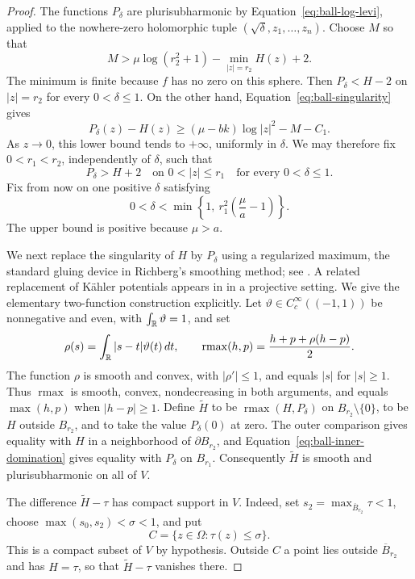 \begin{proof}
The functions $P_\delta$ are plurisubharmonic by
Equation~\eqref{eq:ball-log-levi}, applied to the nowhere-zero
holomorphic tuple $(\sqrt\delta,z_1,\ldots,z_n)$.  Choose $M$ so that
\[
 M>\mu\log(r_2^2+1)-\min_{|z|=r_2}H(z)+2.
\]
The minimum is finite because $f$ has no zero on this sphere.  Then
$P_\delta<H-2$ on $|z|=r_2$ for every $0<\delta\le1$.
On the other hand, Equation~\eqref{eq:ball-singularity} gives
\[
 P_\delta(z)-H(z)
 \ge(\mu-bk)\log|z|^2-M-C_1.
\]
As $z\to0$, this lower bound tends to $+\infty$, uniformly in $\delta$.
We may therefore fix $0<r_1<r_2$, independently of $\delta$, such that
\begin{equation}
 P_\delta>H+2\quad\text{on }0<|z|\le r_1
 \quad\text{for every }0<\delta\le1.
 \label{eq:ball-inner-domination}
\end{equation}
Fix from now on one positive $\delta$ satisfying
\begin{equation}
 0<\delta<\min\left\{1,\ r_1^2\left(\frac\mu a-1\right)\right\}.
 \label{eq:ball-delta-choice}
\end{equation}
The upper bound is positive because $\mu>a$.

We next replace the singularity of $H$ by $P_\delta$ using a
regularized maximum, the standard gluing device in Richberg's smoothing
method; see \cite[Section~2]{HarveyLawsonPlis2020}. A related replacement
of K\"ahler potentials appears in
\cite[Proposition~3.3]{WittNystrom2018} in a projective setting.
We give the elementary two-function construction explicitly. Let
$\vartheta\in C_c^\infty((-1,1))$ be nonnegative and even, with
$\int_{\mathbb R}\vartheta=1$, and set
\[
 \rho(s)=\int_{\mathbb R}|s-t|\vartheta(t)\,dt,
 \qquad
 \operatorname{rmax}(h,p)=\frac{h+p+\rho(h-p)}2.
\]
The function $\rho$ is smooth and convex, with $|\rho'|\le1$, and
equals $|s|$ for $|s|\ge1$.  Thus $\operatorname{rmax}$ is smooth,
convex, nondecreasing in both arguments, and equals $\max(h,p)$ when
$|h-p|\ge1$.  Define $\widetilde H$ to be
$\operatorname{rmax}(H,P_\delta)$ on $B_{r_2}\setminus\{0\}$, to be
$H$ outside $B_{r_2}$, and to take the value $P_\delta(0)$ at zero.
The outer comparison gives equality with $H$ in a neighborhood of
$\partial B_{r_2}$, and Equation~\eqref{eq:ball-inner-domination} gives
equality with $P_\delta$ on $B_{r_1}$.  Consequently $\widetilde H$ is
smooth and plurisubharmonic on all of $V$.

The difference $\widetilde H-\tau$ has compact support in $V$.
Indeed, set $s_2=\max_{\overline B_{r_2}}\tau<1$, choose
$\max(s_0,s_2)<\sigma<1$, and put
\begin{equation}
 C=\{z\in\Omega:\tau(z)\le\sigma\}.
 \label{eq:ball-support}
\end{equation}
This is a compact subset of $V$ by hypothesis.  Outside $C$ a point
lies outside $\overline B_{r_2}$ and has $H=\tau$, so that
$\widetilde H-\tau$ vanishes there.


\end{proof}

